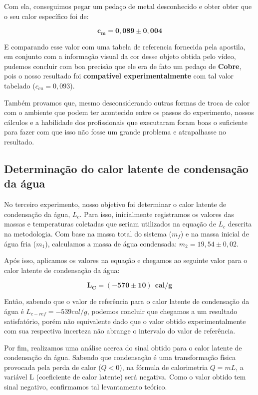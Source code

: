 Com ela, conseguimos pegar um pedaço de metal desconhecido e obter obter que o seu calor específico foi de:

\[ \mathbf{c_m = 0,089 \pm 0,004 } \]

E comparando esse valor com uma tabela de referencia fornecida pela apostila, em conjunto com a informação visual da cor desse objeto obtida pelo vídeo, pudemos concluir com boa precisão que ele era de fato um pedaço de \textbf{Cobre}, pois o nosso resultado foi \textbf{compatível experimentalmente} com tal valor tabelado ($c_{cu} = 0,093$).

Também provamos que, mesmo desconsiderando outras formas de troca de calor com o ambiente que podem ter acontecido entre os passos do experimento, nossos cálculos e a habilidade dos profissionais que executaram foram boas o suficiente para fazer com que isso não fosse um grande problema e atrapalhasse no resultado.


\subsection{Determinação do calor latente de condensação da água}

No terceiro experimento, nosso objetivo foi determinar o calor latente de condensação da água, $L_c$. Para isso, inicialmente registramos os valores das massas e temperaturas coletadas que seriam utilizados na equação de $L_c$ descrita na metodologia. Com base na massa total do sistema ($m_f$) e na massa inicial de água fria ($m_1$), calculamos a massa de água condensada: $m_2 = 19,54 \pm 0,02$.

Após isso, aplicamos os valores na equação e chegamos ao seguinte valor para o calor latente de condensação da água:

\[ \mathbf{L_C = (-570 \pm 10) \ \  cal/g}\]

Então, sabendo que o valor de referência para o calor latente de condensação da água é $L_{c-ref}= -539 cal/g$, podemos concluir que chegamos a um resultado satisfatório, porém não equivalente dado que o valor obtido experimentalmente com sua respectiva incerteza não abrange o intervalo do valor de referência. 

Por fim, realizamos uma análise acerca do sinal obtido para o calor latente de condensação da água. Sabendo que  condensação é uma transformação física provocada pela perda de calor ($Q < 0$), na fórmula de calorimetria $Q = mL$, a variável L (coeficiente de calor latente) será negativa. Como o valor obtido tem sinal negativo, confirmamos tal levantamento teórico.

